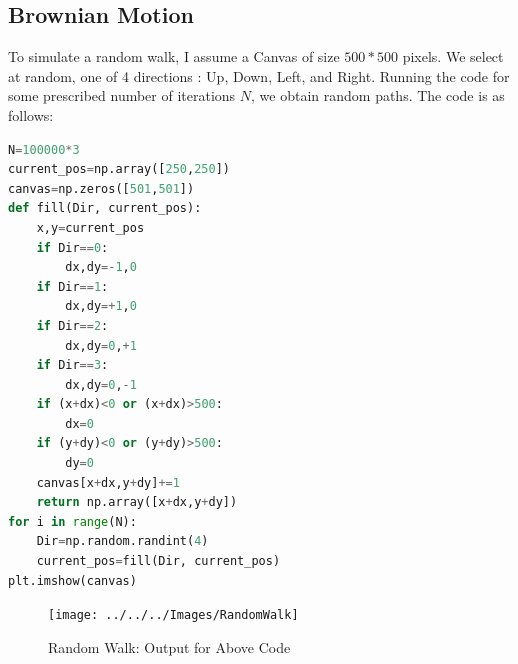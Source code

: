 \subsection{Brownian Motion}
To simulate a random walk, I assume a Canvas of size $500*500$ pixels. We select at random, one of 4 directions : Up, Down, Left, and Right. Running the code for some prescribed number of iterations $N$, we obtain random paths. The code is as follows:
\begin{lstlisting}[language=Python, caption=Random Walk, frame=single, label={lst:randomwalk} ]
N=100000*3
current_pos=np.array([250,250])
canvas=np.zeros([501,501])
def fill(Dir, current_pos):
	x,y=current_pos
	if Dir==0:
		dx,dy=-1,0
	if Dir==1:
		dx,dy=+1,0
	if Dir==2:
		dx,dy=0,+1
	if Dir==3:
		dx,dy=0,-1
	if (x+dx)<0 or (x+dx)>500:
		dx=0
	if (y+dy)<0 or (y+dy)>500:
		dy=0
	canvas[x+dx,y+dy]+=1
	return np.array([x+dx,y+dy])
for i in range(N):
	Dir=np.random.randint(4)
	current_pos=fill(Dir, current_pos)
plt.imshow(canvas)

\end{lstlisting}
\begin{figure}[H]
	\centering
	\texttt{[image: ../../../Images/RandomWalk]}
	\caption[Random Walk]{Random Walk: Output for Above Code}
	\label{fig:randomwalk}
\end{figure}
